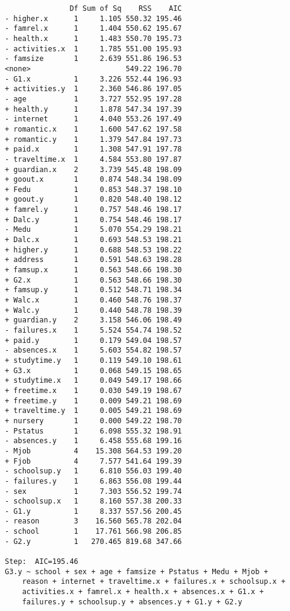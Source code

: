 \documentclass[11pt]{article}
\begin{document}
\begin{enumerate}
\begin{verbatim}
               Df Sum of Sq    RSS    AIC
- higher.x      1     1.105 550.32 195.46
- famrel.x      1     1.404 550.62 195.67
- health.x      1     1.483 550.70 195.73
- activities.x  1     1.785 551.00 195.93
- famsize       1     2.639 551.86 196.53
<none>                      549.22 196.70
- G1.x          1     3.226 552.44 196.93
+ activities.y  1     2.360 546.86 197.05
- age           1     3.727 552.95 197.28
+ health.y      1     1.878 547.34 197.39
- internet      1     4.040 553.26 197.49
+ romantic.x    1     1.600 547.62 197.58
+ romantic.y    1     1.379 547.84 197.73
+ paid.x        1     1.308 547.91 197.78
- traveltime.x  1     4.584 553.80 197.87
+ guardian.x    2     3.739 545.48 198.09
+ goout.x       1     0.874 548.34 198.09
+ Fedu          1     0.853 548.37 198.10
+ goout.y       1     0.820 548.40 198.12
+ famrel.y      1     0.757 548.46 198.17
+ Dalc.y        1     0.754 548.46 198.17
- Medu          1     5.070 554.29 198.21
+ Dalc.x        1     0.693 548.53 198.21
+ higher.y      1     0.688 548.53 198.22
+ address       1     0.591 548.63 198.28
+ famsup.x      1     0.563 548.66 198.30
+ G2.x          1     0.563 548.66 198.30
+ famsup.y      1     0.512 548.71 198.34
+ Walc.x        1     0.460 548.76 198.37
+ Walc.y        1     0.440 548.78 198.39
+ guardian.y    2     3.158 546.06 198.49
- failures.x    1     5.524 554.74 198.52
+ paid.y        1     0.179 549.04 198.57
- absences.x    1     5.603 554.82 198.57
+ studytime.y   1     0.119 549.10 198.61
+ G3.x          1     0.068 549.15 198.65
+ studytime.x   1     0.049 549.17 198.66
+ freetime.x    1     0.030 549.19 198.67
+ freetime.y    1     0.009 549.21 198.69
+ traveltime.y  1     0.005 549.21 198.69
+ nursery       1     0.000 549.22 198.70
- Pstatus       1     6.098 555.32 198.91
- absences.y    1     6.458 555.68 199.16
- Mjob          4    15.308 564.53 199.20
+ Fjob          4     7.577 541.64 199.39
- schoolsup.y   1     6.810 556.03 199.40
- failures.y    1     6.863 556.08 199.44
- sex           1     7.303 556.52 199.74
- schoolsup.x   1     8.160 557.38 200.33
- G1.y          1     8.337 557.56 200.45
- reason        3    16.560 565.78 202.04
- school        1    17.761 566.98 206.85
- G2.y          1   270.465 819.68 347.66

Step:  AIC=195.46
G3.y ~ school + sex + age + famsize + Pstatus + Medu + Mjob + 
    reason + internet + traveltime.x + failures.x + schoolsup.x + 
    activities.x + famrel.x + health.x + absences.x + G1.x + 
    failures.y + schoolsup.y + absences.y + G1.y + G2.y


\end{verbatim}
\end{enumerate}
\end{document}
